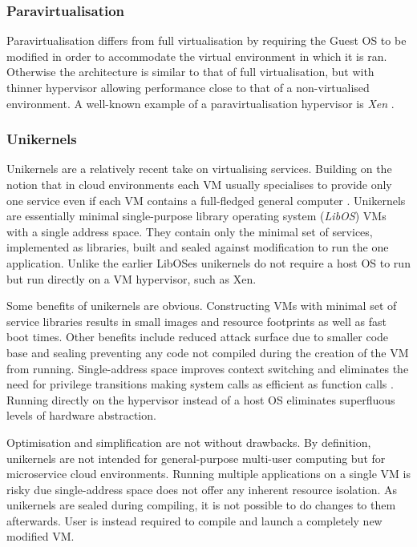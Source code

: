 \subsubsection{Paravirtualisation}

Paravirtualisation differs from full virtualisation by requiring the Guest OS to be modified in order to accommodate the virtual environment in which it is ran. Otherwise the architecture is similar to that of full virtualisation, but with thinner hypervisor allowing performance close to that of a non-virtualised environment. A well-known example of a paravirtualisation hypervisor is \textit{Xen} \cite{xen}.

\subsubsection{Unikernels}

Unikernels are a relatively recent take on virtualising services. Building on the notion that in cloud environments each VM usually specialises to provide only one service even if each VM contains a full-fledged general computer \cite{unikernels}. Unikernels are essentially minimal single-purpose library operating system (\textit{LibOS})\cite{libos} VMs with a single address space. They contain only the minimal set of services, implemented as libraries, built and sealed against modification to run the one application. Unlike the earlier LibOSes unikernels do not require a host OS to run but run directly on a VM hypervisor, such as Xen.

Some benefits of unikernels are obvious. Constructing VMs with minimal set of service libraries results in small images and resource footprints as well as fast boot times. Other benefits include reduced attack surface due to smaller code base and sealing preventing any code not compiled during the creation of the VM from running. Single-address space improves context switching and eliminates the need for privilege transitions making system calls as efficient as function calls \cite{osv}. Running directly on the hypervisor instead of a host OS eliminates superfluous levels of hardware abstraction.

Optimisation and simplification are not without drawbacks. By definition, unikernels are not intended for general-purpose multi-user computing but for microservice cloud environments. Running multiple applications on a single VM is risky due single-address space does not offer any inherent resource isolation. As unikernels are sealed during compiling, it is not possible to do changes to them afterwards. User is instead required to compile and launch a completely new modified VM.

